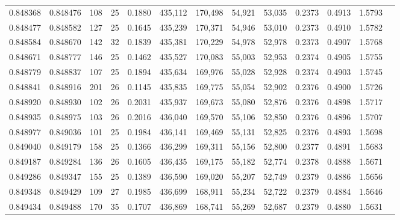 \begin{tabular}{rrrrrrrrrrrrr}
0.848368 & 0.848476 &   108 &  25 &                                     0.1880 & 435,112 & 170,498 &  54,921 &  53,035 & 0.2373 & 0.4913 & 1.5793 \\
0.848477 & 0.848582 &   127 &  25 &                                     0.1645 & 435,239 & 170,371 &  54,946 &  53,010 & 0.2373 & 0.4910 & 1.5782 \\
0.848584 & 0.848670 &   142 &  32 &                                     0.1839 & 435,381 & 170,229 &  54,978 &  52,978 & 0.2373 & 0.4907 & 1.5768 \\
0.848671 & 0.848777 &   146 &  25 &                                     0.1462 & 435,527 & 170,083 &  55,003 &  52,953 & 0.2374 & 0.4905 & 1.5755 \\
0.848779 & 0.848837 &   107 &  25 &                                     0.1894 & 435,634 & 169,976 &  55,028 &  52,928 & 0.2374 & 0.4903 & 1.5745 \\
0.848841 & 0.848916 &   201 &  26 &                                     0.1145 & 435,835 & 169,775 &  55,054 &  52,902 & 0.2376 & 0.4900 & 1.5726 \\
0.848920 & 0.848930 &   102 &  26 &                                     0.2031 & 435,937 & 169,673 &  55,080 &  52,876 & 0.2376 & 0.4898 & 1.5717 \\
0.848935 & 0.848975 &   103 &  26 &                                     0.2016 & 436,040 & 169,570 &  55,106 &  52,850 & 0.2376 & 0.4896 & 1.5707 \\
0.848977 & 0.849036 &   101 &  25 &                                     0.1984 & 436,141 & 169,469 &  55,131 &  52,825 & 0.2376 & 0.4893 & 1.5698 \\
0.849040 & 0.849179 &   158 &  25 &                                     0.1366 & 436,299 & 169,311 &  55,156 &  52,800 & 0.2377 & 0.4891 & 1.5683 \\
0.849187 & 0.849284 &   136 &  26 &                                     0.1605 & 436,435 & 169,175 &  55,182 &  52,774 & 0.2378 & 0.4888 & 1.5671 \\
0.849286 & 0.849347 &   155 &  25 &                                     0.1389 & 436,590 & 169,020 &  55,207 &  52,749 & 0.2379 & 0.4886 & 1.5656 \\
0.849348 & 0.849429 &   109 &  27 &                                     0.1985 & 436,699 & 168,911 &  55,234 &  52,722 & 0.2379 & 0.4884 & 1.5646 \\
0.849434 & 0.849488 &   170 &  35 &                                     0.1707 & 436,869 & 168,741 &  55,269 &  52,687 & 0.2379 & 0.4880 & 1.5631 \\

\end{tabular}
